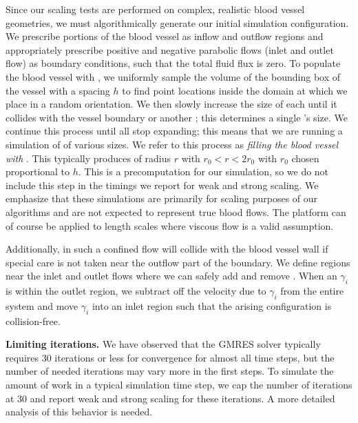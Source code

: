 Since our scaling tests are performed on complex, realistic blood
vessel geometries, we must
algorithmically generate our initial simulation configuration.
We prescribe portions of the blood vessel as inflow and outflow regions and
appropriately prescribe positive and negative parabolic flows (inlet and outlet
flow) as boundary
conditions, such that the total fluid flux is zero.
To populate the blood vessel with \rbcs, we uniformly sample the volume of the 
bounding box of the vessel with a spacing $h$ to find point locations
inside the domain at which we place \rbcs in a random orientation.
We then slowly increase the size of each \rbc until it collides with the
vessel boundary or another \rbc; this determines a single \rbc's size.
We continue this process until all \rbcs stop expanding; this means that 
we are running a simulation of \rbcs of various sizes.
We refer to this process as \textit{filling the blood vessel with }\rbcs.
This typically produces \rbcs of radius $r$ with $r_0 < r < 2r_0$ with $r_0$ chosen proportional to $h$. 
This is a precomputation for our simulation, so we do not include this
step in the timings we report for weak and strong scaling.
We emphasize that these simulations are primarily for scaling purposes
of our algorithms and are not expected to represent true blood flows.
The platform can of course be applied to length scales where viscous
flow is a valid assumption.

Additionally, \rbcs in such a confined flow will collide with the
blood vessel wall
if special care is  not taken near the outflow part of the boundary.
We define regions near the inlet and outlet flows where we can safely add and
remove \rbcs.
When an \rbc $\gamma_i$ is within the outlet region, we subtract off the velocity due to
$\gamma_i$ from the entire system and move $\gamma_i$ into an inlet
region such that the arising \rbc
configuration is collision-free.

\textbf{Limiting  iterations. }
We have observed that the GMRES solver typically requires 30 iterations
or less for convergence for almost all time steps, but the number
of needed iterations may vary more in the first steps. 
To simulate the amount of work in a typical simulation time
step, we cap the number of \gmres iterations at 30 and report weak and strong
scaling for these iterations. A more detailed analysis of this behavior is needed.

